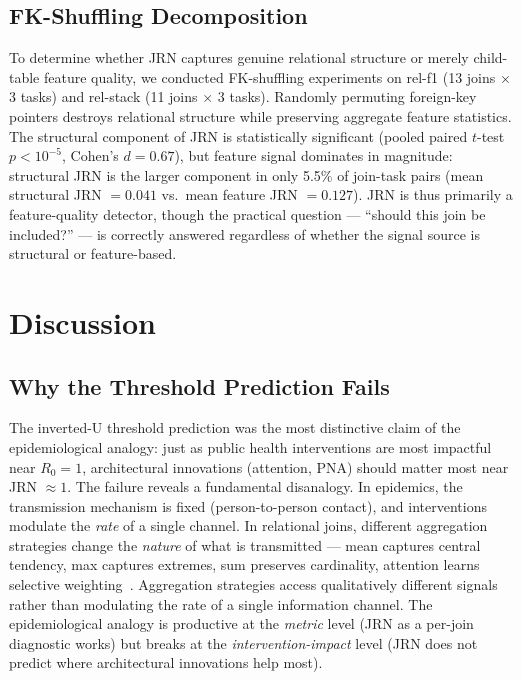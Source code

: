 \documentclass[11pt,letterpaper]{article}
\begin{document}
\subsection{FK-Shuffling Decomposition}
\label{sec:shuffling}

To determine whether JRN captures genuine relational structure or merely child-table feature quality, we conducted FK-shuffling experiments on rel-f1 (13 joins $\times$ 3 tasks) and rel-stack (11 joins $\times$ 3 tasks). Randomly permuting foreign-key pointers destroys relational structure while preserving aggregate feature statistics. The structural component of JRN is statistically significant (pooled paired $t$-test $p < 10^{-5}$, Cohen's $d = 0.67$), but feature signal dominates in magnitude: structural JRN is the larger component in only 5.5\% of join-task pairs (mean structural JRN $= 0.041$ vs.\ mean feature JRN $= 0.127$). JRN is thus primarily a feature-quality detector, though the practical question --- ``should this join be included?'' --- is correctly answered regardless of whether the signal source is structural or feature-based.

\section{Discussion}
\label{sec:discussion}

\subsection{Why the Threshold Prediction Fails}

The inverted-U threshold prediction was the most distinctive claim of the epidemiological analogy: just as public health interventions are most impactful near $R_0 = 1$, architectural innovations (attention, PNA) should matter most near JRN $\approx 1$. The failure reveals a fundamental disanalogy. In epidemics, the transmission mechanism is fixed (person-to-person contact), and interventions modulate the \emph{rate} of a single channel. In relational joins, different aggregation strategies change the \emph{nature} of what is transmitted --- mean captures central tendency, max captures extremes, sum preserves cardinality, attention learns selective weighting~\citep{Velickovic2018, Xu2019, Corso2020}. Aggregation strategies access qualitatively different signals rather than modulating the rate of a single information channel. The epidemiological analogy is productive at the \emph{metric} level (JRN as a per-join diagnostic works) but breaks at the \emph{intervention-impact} level (JRN does not predict where architectural innovations help most).
\end{document}
